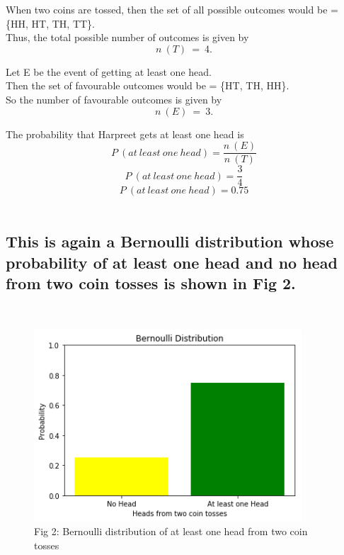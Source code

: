 \documentclass[journal,12pt,twocolumn]{IEEEtran}
\begin{document}
When two coins are tossed, then 
the set of all possible outcomes would be = \{HH, HT, TH, TT\}.\\

Thus, the total possible number of outcomes is given by\\
$$n\ (T)\ =\ 4.$$

Let E be the event of getting at least one head.\\

Then the set of favourable outcomes would be = \{HT, TH, HH\}.\\

So the number of favourable outcomes is given by\\
$$n\ (E)\ =\ 3.$$

\begin{mdframed}
The probability that Harpreet gets at least one head is $$
P\ (at\ least\ one\ head) = \frac{ n\ (E) }{ n\ (T) }
$$
$$
P\ (at\ least\ one\ head) = \frac{ 3 }{ 4 }
$$
$$
P\ (at\ least\ one\ head) = 0.75
$$\\
\end{mdframed}
\subsection*{This is again a Bernoulli distribution whose probability of at least one head and no head from two coin tosses is shown in Fig 2.}\\

\begin{figure}[h!]
    \centering
    \includegraphics[width=10cm]{Assignment-2/Codes/Figures/bern_1_19.png}
    \caption*{Fig 2: Bernoulli distribution of at least one head from two coin tosses}
\end{figure}
\end{document}
